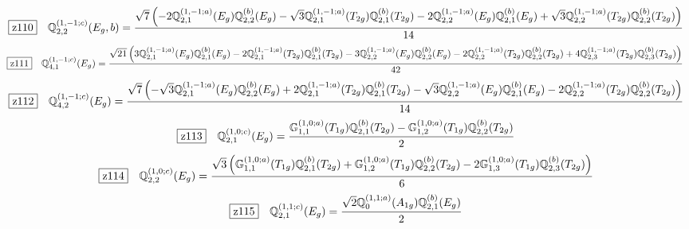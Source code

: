 \documentclass[fleqn,10pt,landscape]{jsarticle}
\begin{document}
\begin{dmath*}
\hspace*{3mm}\fbox{z110}\quad \mathbb{Q}_{2,2}^{(1,-1;c)}(E_{g},b)=\frac{\sqrt{7} \left(- 2 \mathbb{Q}_{2,1}^{(1,-1;a)}(E_{g}) \mathbb{Q}_{2,2}^{(b)}(E_{g}) - \sqrt{3} \mathbb{Q}_{2,1}^{(1,-1;a)}(T_{2g}) \mathbb{Q}_{2,1}^{(b)}(T_{2g}) - 2 \mathbb{Q}_{2,2}^{(1,-1;a)}(E_{g}) \mathbb{Q}_{2,1}^{(b)}(E_{g}) + \sqrt{3} \mathbb{Q}_{2,2}^{(1,-1;a)}(T_{2g}) \mathbb{Q}_{2,2}^{(b)}(T_{2g})\right)}{14}
\end{dmath*}
\begin{dmath*}
\hspace*{3mm}\fbox{z111}\quad \mathbb{Q}_{4,1}^{(1,-1;c)}(E_{g})=\frac{\sqrt{21} \left(3 \mathbb{Q}_{2,1}^{(1,-1;a)}(E_{g}) \mathbb{Q}_{2,1}^{(b)}(E_{g}) - 2 \mathbb{Q}_{2,1}^{(1,-1;a)}(T_{2g}) \mathbb{Q}_{2,1}^{(b)}(T_{2g}) - 3 \mathbb{Q}_{2,2}^{(1,-1;a)}(E_{g}) \mathbb{Q}_{2,2}^{(b)}(E_{g}) - 2 \mathbb{Q}_{2,2}^{(1,-1;a)}(T_{2g}) \mathbb{Q}_{2,2}^{(b)}(T_{2g}) + 4 \mathbb{Q}_{2,3}^{(1,-1;a)}(T_{2g}) \mathbb{Q}_{2,3}^{(b)}(T_{2g})\right)}{42}
\end{dmath*}
\begin{dmath*}
\hspace*{3mm}\fbox{z112}\quad \mathbb{Q}_{4,2}^{(1,-1;c)}(E_{g})=\frac{\sqrt{7} \left(- \sqrt{3} \mathbb{Q}_{2,1}^{(1,-1;a)}(E_{g}) \mathbb{Q}_{2,2}^{(b)}(E_{g}) + 2 \mathbb{Q}_{2,1}^{(1,-1;a)}(T_{2g}) \mathbb{Q}_{2,1}^{(b)}(T_{2g}) - \sqrt{3} \mathbb{Q}_{2,2}^{(1,-1;a)}(E_{g}) \mathbb{Q}_{2,1}^{(b)}(E_{g}) - 2 \mathbb{Q}_{2,2}^{(1,-1;a)}(T_{2g}) \mathbb{Q}_{2,2}^{(b)}(T_{2g})\right)}{14}
\end{dmath*}
\begin{dmath*}
\hspace*{3mm}\fbox{z113}\quad \mathbb{Q}_{2,1}^{(1,0;c)}(E_{g})=\frac{\mathbb{G}_{1,1}^{(1,0;a)}(T_{1g}) \mathbb{Q}_{2,1}^{(b)}(T_{2g}) - \mathbb{G}_{1,2}^{(1,0;a)}(T_{1g}) \mathbb{Q}_{2,2}^{(b)}(T_{2g})}{2}
\end{dmath*}
\begin{dmath*}
\hspace*{3mm}\fbox{z114}\quad \mathbb{Q}_{2,2}^{(1,0;c)}(E_{g})=\frac{\sqrt{3} \left(\mathbb{G}_{1,1}^{(1,0;a)}(T_{1g}) \mathbb{Q}_{2,1}^{(b)}(T_{2g}) + \mathbb{G}_{1,2}^{(1,0;a)}(T_{1g}) \mathbb{Q}_{2,2}^{(b)}(T_{2g}) - 2 \mathbb{G}_{1,3}^{(1,0;a)}(T_{1g}) \mathbb{Q}_{2,3}^{(b)}(T_{2g})\right)}{6}
\end{dmath*}
\begin{dmath*}
\hspace*{3mm}\fbox{z115}\quad \mathbb{Q}_{2,1}^{(1,1;c)}(E_{g})=\frac{\sqrt{2} \mathbb{Q}_{0}^{(1,1;a)}(A_{1g}) \mathbb{Q}_{2,1}^{(b)}(E_{g})}{2}
\end{dmath*}
\end{document}
